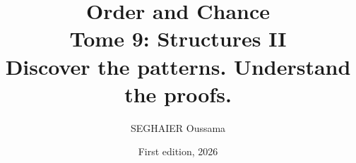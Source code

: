 \documentclass[11pt,openany]{book}
\title{\Huge\textbf{Order and Chance}\\[0.4em]\LARGE Tome 9: Structures II\\[0.6em]
\Large Discover the patterns. Understand the proofs.}
\author{SEGHAIER Oussama}
\date{First edition, 2026}
\begin{document}
\frontmatter
\makecover
\maketitle

\tableofcontents

\mainmatter












\end{document}
